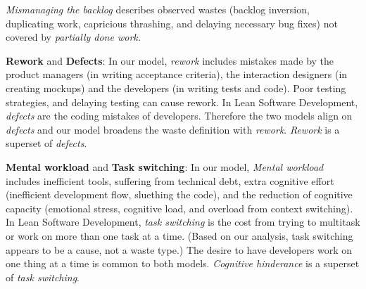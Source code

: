 \textit{Mismanaging the backlog} describes observed wastes (backlog inversion, duplicating work, capricious thrashing, and delaying necessary bug fixes) not covered by \textit{partially done work.}





\textbf{Rework} and \textbf{Defects}: In our model, \textit{rework} includes mistakes made by the product managers (in writing acceptance criteria), the interaction designers (in creating mockups) and the developers (in writing tests and code). Poor testing strategies, and delaying testing can cause rework. In Lean Software Development, \textit{defects} are the coding mistakes of developers. Therefore the two models align on \textit{defects} and our model broadens the waste definition with \textit{rework}. \textit{Rework} is a superset of \textit{defects}. 

\textbf{Mental workload} and \textbf{Task switching}: In our model, \textit{Mental workload} includes inefficient tools, suffering from technical debt, extra cognitive effort (inefficient development flow, sluething the code), and the reduction of cognitive capacity (emotional stress, cognitive load, and overload from context switching). In Lean Software Development, \textit{task switching} is the cost from trying to multitask or work on more than one task at a time. (Based on our analysis, task switching appears to be a cause, not a waste type.) The desire to have developers work on one thing at a time is common to both models. \textit{Cognitive hinderance} is a superset of \textit{task switching}. 

